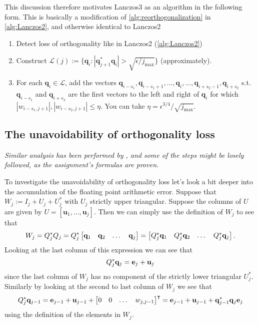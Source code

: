 \documentclass{article}
\begin{document}
This discussion therefore motivates Lanczos3 as an algorithm in the following form. This is basically a modification of \autoref{alg:reorthogonalization} in \autoref{alg:Lanczos2}, and otherwise identical to Lanczos2
\begin{enumerate}
	\item Detect loss of orthogonality like in Lanczos2 (\autoref{alg:Lanczos2})
	\item Construct $\mathcal{L}(j):=\{\mathbf{q}_i:|\mathbf{q}_{j+1}^{\ast}\mathbf{q}_{i}|>\sqrt{\epsilon/j_{\text{max}}}\}$ (approximately).
	\item For each $\mathbf{q}_i\in\mathcal{L}$, add the vectors $\mathbf{q}_{i-s_1},\mathbf{q}_{i-s_1+1},\ldots,\mathbf{q}_{i},\ldots,\mathbf{q}_{i+s_2-1},\mathbf{q}_{i+s_2}$ s.t. $\mathbf{q}_{i-s_1}$ and $\mathbf{q}_{i+s_2}$ are the first vectors to the left and right of $\mathbf{q}_{i}$ for which $|w_{i-s_1,j+1}|,|w_{i-s_2,j+1}|\leq\eta$. You can take $\eta=\epsilon^{3/4}/\sqrt{j_{\text{max}}}$. 
\end{enumerate}

\subsection{The unavoidability of orthogonality loss}
\textit{Similar analysis has been performed by \textcite{paige-1980}, and some of the steps might be losely followed, as the assignment's formulas are proven.}

To investigate the unavoidability of orthogonality loss let's look a bit deeper into the accumulation of the floating point arithmetic error. Suppose that $W_j:=I_j+U_j+U_j^{\ast}$ with $U_j$ strictly upper triangular. Suppose the columns of $U$ are given by $U=[\mathbf{u}_1,\ldots,\mathbf{u}_j]$.
Then we can simply use the definition of $W_j$ to see that
\begin{equation}
	W_j = Q_j^\ast Q_j = Q_j^\ast \begin{bmatrix}
		{\bf q}_1 &{\bf q}_2 &\dots &{\bf q}_j
	\end{bmatrix} = \begin{bmatrix}
	Q_j^\ast {\bf q}_1 &Q_j^\ast {\bf q}_2 &\dots &Q_j^\ast {\bf q}_j
	\end{bmatrix}.
\end{equation}
Looking at the last column of this expression we can see that 
\begin{equation}
	Q_j^\ast {\bf q}_j = {\bf e}_j+ {\bf u}_j
\end{equation}
since the last column of $W_j$ has no component of the strictly lower triangular $U_j^\ast$. Similarly by looking at the second to last column of $W_j$ we see that 
\begin{equation}
	Q_j^\ast {\bf q}_{j-1} = {\bf e}_{j-1}+ {\bf u}_{j-1} + \begin{bmatrix}
		0 & 0 & \dots & w_{j,j-1}
	\end{bmatrix}^\intercal = {\bf e}_{j-1}+ {\bf u}_{j-1} + {\bf q}_{j-1}^\ast {\bf q}_j {\bf e}_j
\end{equation}
using the definition of the elements in $W_j$.
\end{document}
